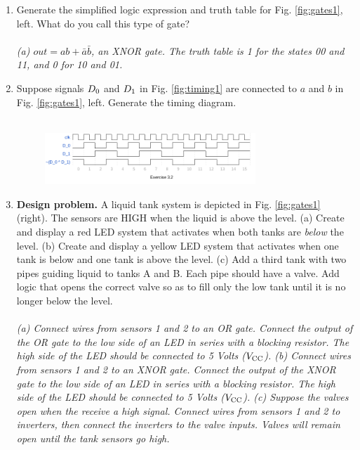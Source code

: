 \documentclass[10pt]{article}
\begin{document}
\begin{enumerate}
\item Generate the simplified logic expression and truth table for Fig. \ref{fig:gates1}, left.  What do you call this type of gate? \\ \\
\textit{(a) $out = ab + \bar{a} \bar{b}$, an XNOR gate.  The truth table is 1 for the states 00 and 11, and 0 for 10 and 01.} \\
\item Suppose signals $D_{\rm 0}$ and $D_{\rm 1}$ in Fig. \ref{fig:timing1} are connected to $a$ and $b$ in Fig. \ref{fig:gates1}, left.  Generate the timing diagram. \\ \\
\begin{figure}
\centering
\includegraphics[width=0.75\textwidth]{timing_4.png}
\end{figure}
\item \textbf{Design problem.}  A liquid tank system is depicted in Fig. \ref{fig:gates1} (right).  The sensors are HIGH when the liquid is above the level.  (a) Create and display a red LED system that activates when both tanks are \textit{below} the level.  (b) Create and display a yellow LED system that activates when one tank is below and one tank is above the level.  (c) Add a third tank with two pipes guiding liquid to tanks A and B.  Each pipe should have a valve.  Add logic that opens the correct valve so as to fill only the low tank until it is no longer below the level.  \\ \\
\textit{(a) Connect wires from sensors 1 and 2 to an OR gate.  Connect the output of the OR gate to the low side of an LED in series with a blocking resistor.  The high side of the LED should be connected to 5 Volts ($V_{\rm CC}$). (b) Connect wires from sensors 1 and 2 to an XNOR gate.  Connect the output of the XNOR gate to the low side of an LED in series with a blocking resistor.  The high side of the LED should be connected to 5 Volts ($V_{\rm CC}$). (c) Suppose the valves open when the receive a high signal.  Connect wires from sensors 1 and 2 to inverters, then connect the inverters to the valve inputs.  Valves will remain open until the tank sensors go high.}
\end{enumerate}
\end{document}
